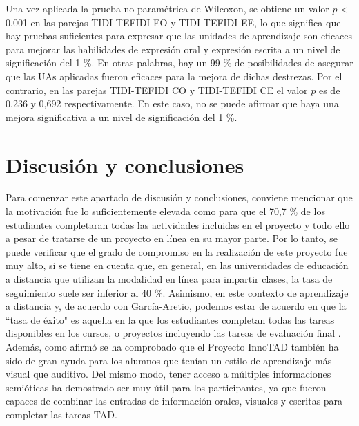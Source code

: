 \documentclass[spanish]{textolivre}
\begin{document}
Una vez aplicada la prueba no paramétrica de Wilcoxon, se obtiene un valor $p$ < 0,001 en las parejas TIDI-TEFIDI EO y TIDI-TEFIDI EE, lo que significa que hay pruebas suficientes para expresar que las unidades de aprendizaje son eficaces para mejorar las habilidades de expresión oral y expresión escrita a un nivel de significación del 1 \%. En otras palabras, hay un 99 \% de posibilidades de asegurar que las UAs aplicadas fueron eficaces para la mejora de dichas destrezas. Por el contrario, en las parejas TIDI-TEFIDI CO y TIDI-TEFIDI CE el valor $p$ es de 0,236 y 0,692 respectivamente. En este caso, no se puede afirmar que haya una mejora significativa a un nivel de significación del 1 \%.

\section{Discusión y conclusiones}
Para comenzar este apartado de discusión y conclusiones, conviene mencionar que la motivación fue lo suficientemente elevada como para que el 70,7 \% de los estudiantes completaran todas las actividades incluidas en el proyecto y todo ello a pesar de tratarse de un proyecto en línea en su mayor parte. Por lo tanto, se puede verificar que el grado de compromiso en la realización de este proyecto fue muy alto, si se tiene en cuenta que, en general, en las universidades de educación a distancia que utilizan la modalidad en línea para impartir clases, la tasa de seguimiento suele ser inferior al 40 \%. Asimismo, en este contexto de aprendizaje a distancia y, de acuerdo con García-Aretio, podemos estar de acuerdo en que la ``tasa de éxito" es aquella en la que los estudiantes completan todas las tareas disponibles en los cursos, o proyectos incluyendo las tareas de evaluación final \citeyear{garcia-aretio2017}. Además, como afirmó \textcite{tarquini2016} se ha comprobado que el Proyecto InnoTAD también ha sido de gran ayuda para los alumnos que tenían un estilo de aprendizaje más visual que auditivo. Del mismo modo, tener acceso a múltiples informaciones semióticas \cite{gambier2015} ha demostrado ser muy útil para los participantes, ya que fueron capaces de combinar las entradas de información orales, visuales y escritas para completar las tareas TAD.
\end{document}
